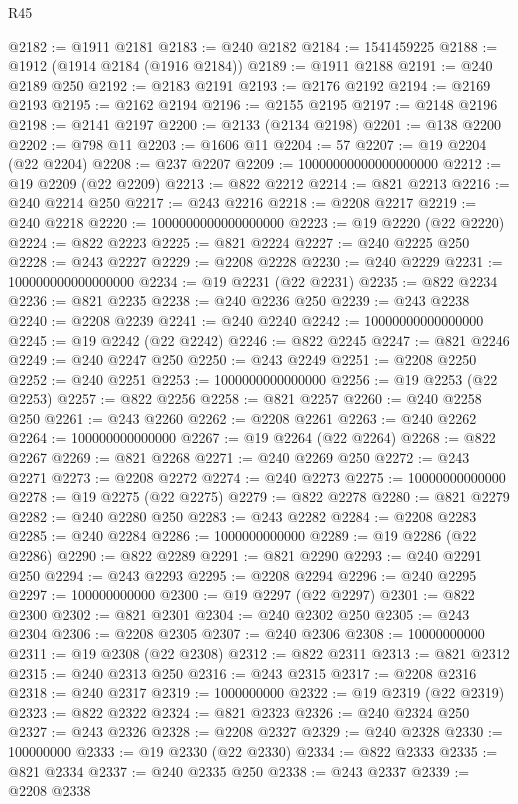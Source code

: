 \begin{lexlean}{R45}
\begin{coremodule}
{@2182 := @1911 @2181
@2183 := @240 @2182
@2184 := 1541459225
@2188 := @1912 (@1914 @2184 (@1916 @2184))
@2189 := @1911 @2188
@2191 := @240 @2189 @250
@2192 := @2183 @2191
@2193 := @2176 @2192
@2194 := @2169 @2193
@2195 := @2162 @2194
@2196 := @2155 @2195
@2197 := @2148 @2196
@2198 := @2141 @2197
@2200 := @2133 (@2134 @2198)
@2201 := @138 @2200
@2202 := @798 @11
@2203 := @1606 @11
@2204 := 57
@2207 := @19 @2204 (@22 @2204)
@2208 := @237 @2207
@2209 := 10000000000000000000
@2212 := @19 @2209 (@22 @2209)
@2213 := @822 @2212
@2214 := @821 @2213
@2216 := @240 @2214 @250
@2217 := @243 @2216
@2218 := @2208 @2217
@2219 := @240 @2218
@2220 := 1000000000000000000
@2223 := @19 @2220 (@22 @2220)
@2224 := @822 @2223
@2225 := @821 @2224
@2227 := @240 @2225 @250
@2228 := @243 @2227
@2229 := @2208 @2228
@2230 := @240 @2229
@2231 := 100000000000000000
@2234 := @19 @2231 (@22 @2231)
@2235 := @822 @2234
@2236 := @821 @2235
@2238 := @240 @2236 @250
@2239 := @243 @2238
@2240 := @2208 @2239
@2241 := @240 @2240
@2242 := 10000000000000000
@2245 := @19 @2242 (@22 @2242)
@2246 := @822 @2245
@2247 := @821 @2246
@2249 := @240 @2247 @250
@2250 := @243 @2249
@2251 := @2208 @2250
@2252 := @240 @2251
@2253 := 1000000000000000
@2256 := @19 @2253 (@22 @2253)
@2257 := @822 @2256
@2258 := @821 @2257
@2260 := @240 @2258 @250
@2261 := @243 @2260
@2262 := @2208 @2261
@2263 := @240 @2262
@2264 := 100000000000000
@2267 := @19 @2264 (@22 @2264)
@2268 := @822 @2267
@2269 := @821 @2268
@2271 := @240 @2269 @250
@2272 := @243 @2271
@2273 := @2208 @2272
@2274 := @240 @2273
@2275 := 10000000000000
@2278 := @19 @2275 (@22 @2275)
@2279 := @822 @2278
@2280 := @821 @2279
@2282 := @240 @2280 @250
@2283 := @243 @2282
@2284 := @2208 @2283
@2285 := @240 @2284
@2286 := 1000000000000
@2289 := @19 @2286 (@22 @2286)
@2290 := @822 @2289
@2291 := @821 @2290
@2293 := @240 @2291 @250
@2294 := @243 @2293
@2295 := @2208 @2294
@2296 := @240 @2295
@2297 := 100000000000
@2300 := @19 @2297 (@22 @2297)
@2301 := @822 @2300
@2302 := @821 @2301
@2304 := @240 @2302 @250
@2305 := @243 @2304
@2306 := @2208 @2305
@2307 := @240 @2306
@2308 := 10000000000
@2311 := @19 @2308 (@22 @2308)
@2312 := @822 @2311
@2313 := @821 @2312
@2315 := @240 @2313 @250
@2316 := @243 @2315
@2317 := @2208 @2316
@2318 := @240 @2317
@2319 := 1000000000
@2322 := @19 @2319 (@22 @2319)
@2323 := @822 @2322
@2324 := @821 @2323
@2326 := @240 @2324 @250
@2327 := @243 @2326
@2328 := @2208 @2327
@2329 := @240 @2328
@2330 := 100000000
@2333 := @19 @2330 (@22 @2330)
@2334 := @822 @2333
@2335 := @821 @2334
@2337 := @240 @2335 @250
@2338 := @243 @2337
@2339 := @2208 @2338
}
\end{coremodule}
\end{lexlean}
